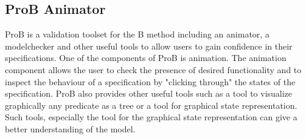 \subsection{ProB Animator}
\label{prob_animator}

ProB is a validation toolset for the B method including an animator, a modelchecker and other useful tools to allow users to gain confidence in their specifications. One of the components of ProB is animation. The animation component allows the user to check the presence of desired functionality and to inspect the behaviour of a specification by "clicking through" the states of the specification. ProB also provides other useful tools such as a tool to visualize graphically any predicate as a tree or a tool for graphical state representation. Such tools, especially the tool for the graphical state representation can give a better understanding of the model.
